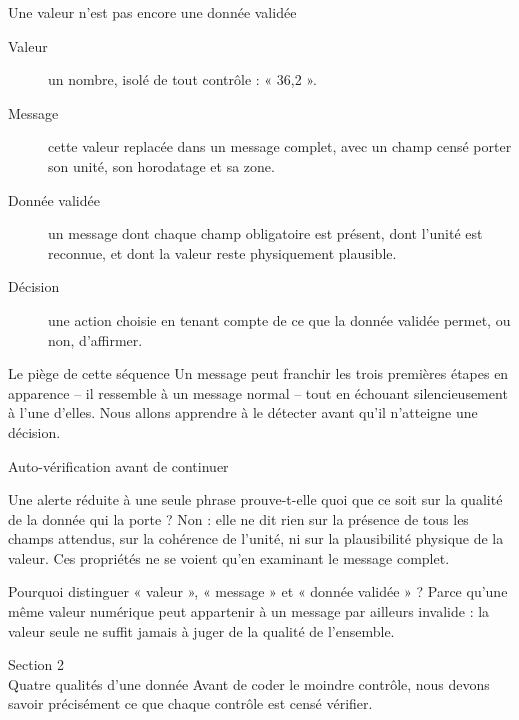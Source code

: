 \documentclass[aspectratio=169]{beamer}
\begin{document}
\begin{frame}{Une valeur n'est pas encore une donnée validée}
  \begin{description}
    \item[Valeur] un nombre, isolé de tout contrôle : « 36,2 ».
    \item[Message] cette valeur replacée dans un message complet, avec un champ censé porter son unité, son horodatage et sa zone.
    \item[Donnée validée] un message dont chaque champ obligatoire est présent, dont l'unité est reconnue, et dont la valeur reste physiquement plausible.
    \item[Décision] une action choisie en tenant compte de ce que la donnée validée permet, ou non, d'affirmer.
  \end{description}
  \begin{block}{Le piège de cette séquence}
    Un message peut franchir les trois premières étapes en apparence -- il ressemble à un message normal -- tout en échouant silencieusement à l'une d'elles. Nous allons apprendre à le détecter avant qu'il n'atteigne une décision.
  \end{block}
\end{frame}

\begin{frame}{Auto-vérification avant de continuer}
  \small
  \begin{block}{Une alerte réduite à une seule phrase prouve-t-elle quoi que ce soit sur la qualité de la donnée qui la porte ?}
    Non : elle ne dit rien sur la présence de tous les champs attendus, sur la cohérence de l'unité, ni sur la plausibilité physique de la valeur. Ces propriétés ne se voient qu'en examinant le message complet.
  \end{block}
  \begin{block}{Pourquoi distinguer « valeur », « message » et « donnée validée » ?}
    Parce qu'une même valeur numérique peut appartenir à un message par ailleurs invalide : la valeur seule ne suffit jamais à juger de la qualité de l'ensemble.
  \end{block}
\end{frame}

\begin{frame}[plain]
  \centering
  \Huge Section 2\\[3mm]
  \Large Quatre qualités d'une donnée
  \vfill
  \normalsize Avant de coder le moindre contrôle, nous devons savoir précisément ce que chaque contrôle est censé vérifier.
\end{frame}
\end{document}
